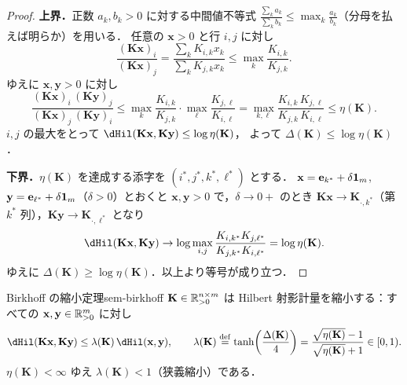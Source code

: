 \begin{proof}
  \textbf{上界．}正数 $a_k, b_k > 0$ に対する中間値不等式
  $\frac{\sum_k a_k}{\sum_k b_k} \leq \max_k \frac{a_k}{b_k}$（分母を払えば明らか）を用いる．
  任意の $\mathbf{x} > 0$ と行 $i, j$ に対し
  \[
    \frac{(\mathbf{K}\mathbf{x})_i}{(\mathbf{K}\mathbf{x})_j}
    = \frac{\sum_k K_{i,k} x_k}{\sum_k K_{j,k} x_k}
    \leq \max_k \frac{K_{i,k}}{K_{j,k}}.
  \]
  ゆえに $\mathbf{x}, \mathbf{y} > 0$ に対し
  \[
    \frac{(\mathbf{K}\mathbf{x})_i\,(\mathbf{K}\mathbf{y})_j}{(\mathbf{K}\mathbf{x})_j\,(\mathbf{K}\mathbf{y})_i}
    \leq \max_k \frac{K_{i,k}}{K_{j,k}} \cdot \max_\ell \frac{K_{j,\ell}}{K_{i,\ell}}
    = \max_{k,\ell} \frac{K_{i,k}\,K_{j,\ell}}{K_{j,k}\,K_{i,\ell}}
    \leq \eta(\mathbf{K}).
  \]
  $i, j$ の最大をとって $\dHil(\mathbf{K}\mathbf{x}, \mathbf{K}\mathbf{y}) \leq \log\eta(\mathbf{K})$，
  よって $\Delta(\mathbf{K}) \leq \log\eta(\mathbf{K})$．

  \textbf{下界．}$\eta(\mathbf{K})$ を達成する添字を $(i^*, j^*, k^*, \ell^*)$ とする．
  $\mathbf{x} = \mathbf{e}_{k^*} + \delta\mathbf{1}_m$, $\mathbf{y} = \mathbf{e}_{\ell^*} + \delta\mathbf{1}_m$（$\delta > 0$）とおくと
  $\mathbf{x}, \mathbf{y} > 0$ で，$\delta \to 0+$ のとき
  $\mathbf{K}\mathbf{x} \to \mathbf{K}_{\cdot,k^*}$（第 $k^*$ 列），$\mathbf{K}\mathbf{y} \to \mathbf{K}_{\cdot,\ell^*}$ となり
  \[
    \dHil(\mathbf{K}\mathbf{x}, \mathbf{K}\mathbf{y})
    \to \log\max_{i,j}\frac{K_{i,k^*}K_{j,\ell^*}}{K_{j,k^*}K_{i,\ell^*}}
    = \log\eta(\mathbf{K}).
  \]
  ゆえに $\Delta(\mathbf{K}) \geq \log\eta(\mathbf{K})$．以上より等号が成り立つ．
\end{proof}

\begin{theorem}{Birkhoff の縮小定理}{sem-birkhoff}
  $\mathbf{K} \in \mathbb{R}_{>0}^{n\times m}$ は Hilbert 射影計量を縮小する：すべての
  $\mathbf{x}, \mathbf{y} \in \mathbb{R}_{>0}^m$ に対し
  \[
    \dHil(\mathbf{K}\mathbf{x}, \mathbf{K}\mathbf{y})
    \leq \lambda(\mathbf{K})\, \dHil(\mathbf{x}, \mathbf{y}),
    \qquad
    \lambda(\mathbf{K})
    \defeq \tanh\!\left(\frac{\Delta(\mathbf{K})}{4}\right)
    = \frac{\sqrt{\eta(\mathbf{K})} - 1}{\sqrt{\eta(\mathbf{K})} + 1} \in [0, 1).
  \]
  $\eta(\mathbf{K}) < \infty$ ゆえ $\lambda(\mathbf{K}) < 1$（狭義縮小）である．
\end{theorem}

